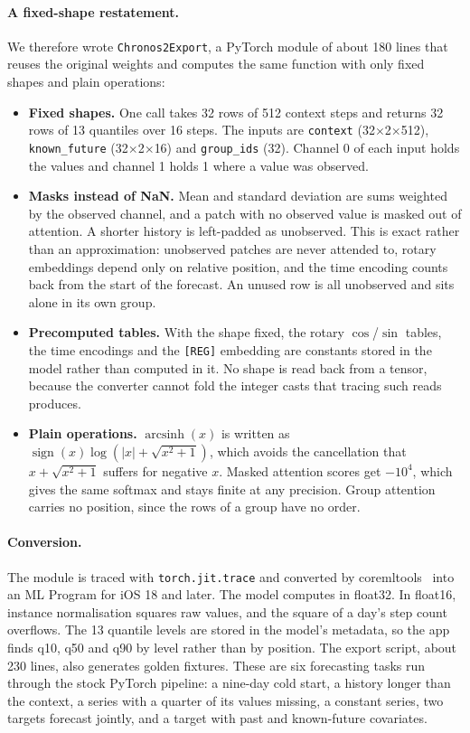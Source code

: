 \documentclass[11pt,a4paper]{article}
\begin{document}
\paragraph{A fixed-shape restatement.} We therefore wrote \texttt{Chronos2Export}, a PyTorch module of about 180 lines that reuses the original weights and computes the same function with only fixed shapes and plain operations:

\begin{itemize}
  \item \textbf{Fixed shapes.} One call takes 32 rows of 512 context steps and returns 32 rows of 13 quantiles over 16 steps. The inputs are \texttt{context} (32$\times$2$\times$512), \texttt{known\_future} (32$\times$2$\times$16) and \texttt{group\_ids} (32). Channel 0 of each input holds the values and channel 1 holds 1 where a value was observed.
  \item \textbf{Masks instead of NaN.} Mean and standard deviation are sums weighted by the observed channel, and a patch with no observed value is masked out of attention. A shorter history is left-padded as unobserved. This is exact rather than an approximation: unobserved patches are never attended to, rotary embeddings depend only on relative position, and the time encoding counts back from the start of the forecast. An unused row is all unobserved and sits alone in its own group.
  \item \textbf{Precomputed tables.} With the shape fixed, the rotary $\cos$/$\sin$ tables, the time encodings and the \texttt{[REG]} embedding are constants stored in the model rather than computed in it. No shape is read back from a tensor, because the converter cannot fold the integer casts that tracing such reads produces.
  \item \textbf{Plain operations.} $\operatorname{arcsinh}(x)$ is written as $\operatorname{sign}(x)\log(|x|+\sqrt{x^2+1})$, which avoids the cancellation that $x+\sqrt{x^2+1}$ suffers for negative $x$. Masked attention scores get $-10^4$, which gives the same softmax and stays finite at any precision. Group attention carries no position, since the rows of a group have no order.
\end{itemize}

\paragraph{Conversion.} The module is traced with \texttt{torch.jit.trace} and converted by coremltools~\cite{coremltools} into an ML Program for iOS 18 and later. The model computes in float32. In float16, instance normalisation squares raw values, and the square of a day's step count overflows. The 13 quantile levels are stored in the model's metadata, so the app finds q10, q50 and q90 by level rather than by position. The export script, about 230 lines, also generates golden fixtures. These are six forecasting tasks run through the stock PyTorch pipeline: a nine-day cold start, a history longer than the context, a series with a quarter of its values missing, a constant series, two targets forecast jointly, and a target with past and known-future covariates.
\end{document}
